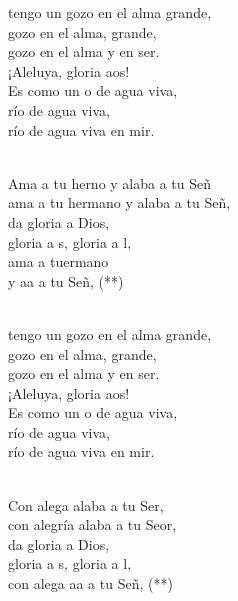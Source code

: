 \documentclass[12pt]{article}
\begin{document}
\begin{multicols*}{2}
\begin{cancion}%
	\begin{chorus}%
	 tengo un gozo en el alma grande,\\
gozo en el alma, grande,\\
	gozo en el alma y en ser.\\
	¡Aleluya, gloria aos!\\
	Es como un o de agua viva, \\
río de agua viva,\\
	río de agua viva en mir. \\
	\end{chorus}%
	\jump\\
	Ama a tu herno y alaba a tu Señ \\
	ama a tu hermano y alaba a tu Señ, \\
da gloria a Dios,\\
	gloria a s, gloria a l,\\
	ama a tuermano \\
	y aa a tu Señ, (**)\\\jump\\
	\begin{chorus}%
	 tengo un gozo en el alma grande,\\
gozo en el alma, grande,\\
	gozo en el alma y en ser.\\
	¡Aleluya, gloria aos!\\
	Es como un o de agua viva, \\
río de agua viva,\\
	río de agua viva en mir. \\
	\end{chorus}%
	\jump\\
	Con alega alaba a tu Ser, \\
	con alegría alaba a tu Seor,\\
da gloria a Dios,\\
	gloria a s, gloria a l,\\
	con alega aa a tu Señ, (**)  \\

\end{cancion}
\end{multicols*}
\end{document}
